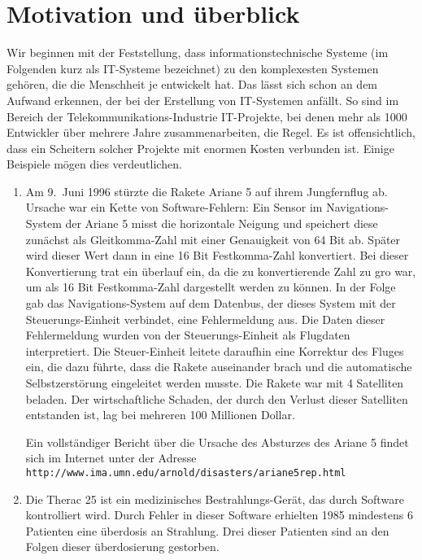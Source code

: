 \section{Motivation und \"{u}berblick}
Wir beginnen mit der Feststellung, dass informationstechnische Systeme 
(im Folgenden kurz als IT-Systeme bezeichnet) zu den komplexesten Systemen geh\"{o}ren, die
die Menschheit je entwickelt hat.  Das l\"{a}sst sich schon an dem Aufwand erkennen,
der bei der Erstellung von IT-Systemen anf\"{a}llt.  So sind im Bereich der Telekommunikations-Industrie
IT-Projekte, bei denen mehr als 1000 Entwickler \"{u}ber mehrere Jahre zusammenarbeiten,
die Regel.  Es ist offensichtlich, dass ein Scheitern solcher Projekte mit enormen
 Kosten verbunden ist.  Einige Beispiele m\"{o}gen dies verdeutlichen.
\begin{enumerate}
\item Am 9.~Juni 1996 st\"{u}rzte die Rakete Ariane 5 auf ihrem Jungfernflug ab.
      Ursache war ein Kette von Software-Fehlern:  Ein Sensor im Navigations-System
      der Ariane 5 misst die horizontale Neigung und speichert diese zun\"{a}chst als Gleitkomma-Zahl
      mit einer Genauigkeit von 64 Bit ab.  Sp\"{a}ter wird dieser Wert dann in eine 
      16 Bit Festkomma-Zahl konvertiert.
      Bei dieser Konvertierung trat ein \"{u}berlauf ein, da die zu konvertierende Zahl
      zu gro\3 war, um als 16 Bit Festkomma-Zahl dargestellt werden zu k\"{o}nnen.
      In der Folge gab das Navigations-System auf dem Datenbus, der dieses System mit
      der Steuerungs-Einheit verbindet, eine Fehlermeldung aus.
       Die Daten dieser Fehlermeldung wurden von der Steuerungs-Einheit als Flugdaten 
      interpretiert.  Die Steuer-Einheit leitete daraufhin eine Korrektur des
      Fluges ein, die dazu f\"{u}hrte, dass die Rakete auseinander brach und die 
      automatische Selbstzerst\"{o}rung eingeleitet werden musste.
      Die Rakete war mit 4 Satelliten beladen. Der wirtschaftliche Schaden, der durch den Verlust dieser
      Satelliten entstanden ist, lag bei mehreren 100 Millionen Dollar.
      
      Ein vollst\"{a}ndiger Bericht \"{u}ber die Ursache des Absturzes des Ariane 5 findet sich
      im Internet unter der Adresse \\[0.1cm]
      \hspace*{1.3cm} \texttt{http://www.ima.umn.edu/arnold/disasters/ariane5rep.html}
\item Die Therac 25 ist ein medizinisches Bestrahlungs-Ger\"{a}t, das durch 
      Software kontrolliert wird.  Durch  Fehler in dieser Software erhielten 1985
      mindestens 6 Patienten eine \"{u}berdosis an Strahlung.  Drei dieser Patienten sind an den Folgen dieser 
      \"{u}berdosierung gestorben. 


\end{enumerate}
